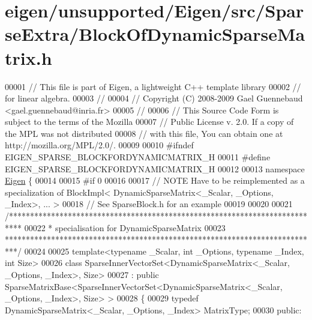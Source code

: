 \hypertarget{eigen_2unsupported_2_eigen_2src_2_sparse_extra_2_block_of_dynamic_sparse_matrix_8h_source}{}\section{eigen/unsupported/\+Eigen/src/\+Sparse\+Extra/\+Block\+Of\+Dynamic\+Sparse\+Matrix.h}
\label{eigen_2unsupported_2_eigen_2src_2_sparse_extra_2_block_of_dynamic_sparse_matrix_8h_source}

\begin{DoxyCode}
00001 \textcolor{comment}{// This file is part of Eigen, a lightweight C++ template library}
00002 \textcolor{comment}{// for linear algebra.}
00003 \textcolor{comment}{//}
00004 \textcolor{comment}{// Copyright (C) 2008-2009 Gael Guennebaud <gael.guennebaud@inria.fr>}
00005 \textcolor{comment}{//}
00006 \textcolor{comment}{// This Source Code Form is subject to the terms of the Mozilla}
00007 \textcolor{comment}{// Public License v. 2.0. If a copy of the MPL was not distributed}
00008 \textcolor{comment}{// with this file, You can obtain one at http://mozilla.org/MPL/2.0/.}
00009 
00010 \textcolor{preprocessor}{#ifndef EIGEN\_SPARSE\_BLOCKFORDYNAMICMATRIX\_H}
00011 \textcolor{preprocessor}{#define EIGEN\_SPARSE\_BLOCKFORDYNAMICMATRIX\_H}
00012 
00013 \textcolor{keyword}{namespace }\hyperlink{namespace_eigen}{Eigen} \{ 
00014 
00015 \textcolor{preprocessor}{#if 0}
00016 
00017 \textcolor{comment}{// NOTE Have to be reimplemented as a specialization of BlockImpl< DynamicSparseMatrix<\_Scalar, \_Options,
       \_Index>, ... >}
00018 \textcolor{comment}{// See SparseBlock.h for an example}
00019 
00020 
00021 \textcolor{comment}{/***************************************************************************}
00022 \textcolor{comment}{* specialisation for DynamicSparseMatrix}
00023 \textcolor{comment}{***************************************************************************/}
00024 
00025 \textcolor{keyword}{template}<\textcolor{keyword}{typename} \_Scalar, \textcolor{keywordtype}{int} \_Options, \textcolor{keyword}{typename} \_Index, \textcolor{keywordtype}{int} Size>
00026 \textcolor{keyword}{class }SparseInnerVectorSet<DynamicSparseMatrix<\_Scalar, \_Options, \_Index>, Size>
00027   : \textcolor{keyword}{public} SparseMatrixBase<SparseInnerVectorSet<DynamicSparseMatrix<\_Scalar, \_Options, \_Index>, Size> >
00028 \{
00029     \textcolor{keyword}{typedef} DynamicSparseMatrix<\_Scalar, \_Options, \_Index> MatrixType;
00030   \textcolor{keyword}{public}:

\end{DoxyCode}
